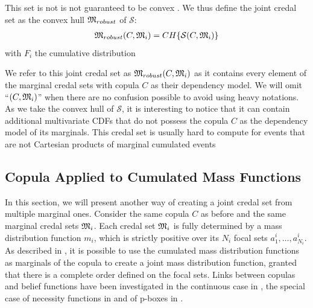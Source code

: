 This set is not is not guaranteed to be convex \cite{schmelzer_random_2023}. We thus define the joint credal set as the convex hull ${\mathfrak{M}}_{robust}$ of $\mathcal{S}$:
\begin{eqnarray}\label{eq:robust_set}
    {\mathfrak{M}}_{robust}(C,{\mathfrak{M}}_i) = CH\{\mathcal{S}(C,{\mathfrak{M}}_i)\}
\end{eqnarray}
with $F_i$ the cumulative distribution

We refer to this joint credal set as ${\mathfrak{M}}_{robust}(C,{\mathfrak{M}}_i)$ as it contains every element of the marginal credal sets with copula $C$ as their dependency model. We will omit ``$(C,{\mathfrak{M}}_i)$'' when there are no confusion possible to avoid using heavy notations. As we take the convex hull of $\mathcal{S}$, it is interesting to notice that it can contain additional multivariate CDFs that do not possess the copula $C$ as the dependency model of its marginals. This credal set is usually hard to compute for events that are not Cartesian products of marginal cumulated events

\subsection{Copula Applied to Cumulated Mass Functions}\label{sec:joint_mass}
In this section, we will present another way of creating a joint credal set from multiple marginal ones. Consider the same copula $C$ as before and the same marginal credal sets ${\mathfrak{M}}_i$. Each credal set ${\mathfrak{M}}_i$ is fully determined by a mass distribution function $m_i$, which is strictly positive over its $N_i$ focal sets $a^i_1, \dots, a^i_{N_i}$. As described in \cite{ferson_dependence_2004}, it is possible to use the cumulated mass distribution functions as marginals of the copula to create a joint mass distribution function, granted that there is a complete order defined on the focal sets. Links between copulas and belief functions have been investigated in the continuous case in \cite{schmelzer_joint_2015, schmelzer_multivariate_2019}, the special case of necessity functions in \cite{schmelzer_sklars_2015} and of p-boxes in \cite{schmelzer_random_2023}.

